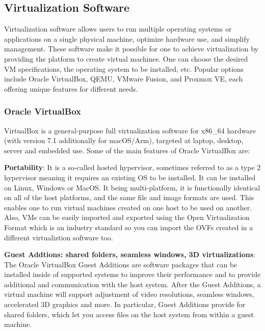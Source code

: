 \documentclass[a4paper,12pt]{report}
\begin{document}
\subsection{Virtualization Software}
Virtualization software allows users to run multiple operating systems or applications on a single physical machine, optimize hardware use, and simplify management.
\newline
These software make it possible for one to achieve virtualization by providing the platform to create virtual machines. One can choose the desired VM specifications, the operating system to be installed, etc.
\newline
Popular options include Oracle VirtualBox, QEMU, VMware Fusion, and Proxmox VE, each offering unique features for different needs.
\newline
\subsubsection{Oracle VirtualBox}
VirtualBox is a general-purpose full virtualization software for x86\_64 hardware (with version 7.1 additionally for macOS/Arm), targeted at laptop, desktop, server and embedded use.
\newline
Some of the main features of Oracle VirtualBox are:

\textbf{Portability}: It is a so-called hosted hypervisor, sometimes referred to as a type 2 hypervisor meaning it requires an existing OS to be installed.
\newline
It can be installed on Linux, Windows or MacOS. It being multi-platform, it is functionally identical on all of the host platforms, and the same file and image formats are used. This enables one to run virtual machines created on one host to be used on another.
\newline
Also, VMs can be easily imported and exported using the Open Virtualization Format which is an industry standard so you can import the OVFs created in a different virtualiztion software too.


\textbf{Guest Addtions: shared folders, seamless windows, 3D virtualizations}: The Oracle VirtualBox Guest Additions are software packages that can be installed inside of supported systems to improve their performance and to provide additional and communication with the host system.
\newline
After the Guest Additions, a virtual machine will support adjustment of video resolutions, seamless windows, accelerated 3D graphics and more. 
\newline
In particular, Guest Additions provide for shared folders, which let you access files on the host system from within a guest machine.
\end{document}
